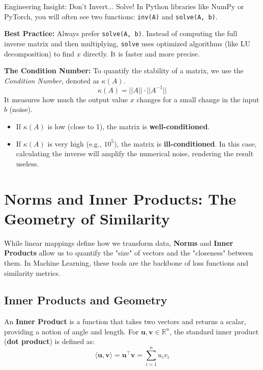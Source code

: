 \begin{unibobox}{Engineering Insight: Don't Invert... Solve!}
In Python libraries like NumPy or PyTorch, you will often see two functions: \texttt{inv(A)} and \texttt{solve(A, b)}.

\textbf{Best Practice:} Always prefer \texttt{solve(A, b)}.
Instead of computing the full inverse matrix and then multiplying, \texttt{solve} uses optimized algorithms (like LU decomposition) to find $x$ directly. It is faster and more precise.

\textbf{The Condition Number:}
To quantify the stability of a matrix, we use the \textit{Condition Number}, denoted as $\kappa(A)$.
\[
\kappa(A) = ||A|| \cdot ||A^{-1}||
\]
It measures how much the output value $x$ changes for a small change in the input $b$ (noise).
\begin{itemize}
    \item If $\kappa(A)$ is low (close to 1), the matrix is \textbf{well-conditioned}.
    \item If $\kappa(A)$ is very high (e.g., $10^5$), the matrix is \textbf{ill-conditioned}. In this case, calculating the inverse will amplify the numerical noise, rendering the result useless.
\end{itemize}
\end{unibobox}

\section{Norms and Inner Products: The Geometry of Similarity}

While linear mappings define how we transform data, \textbf{Norms} and \textbf{Inner Products} allow us to quantify the "size" of vectors and the "closeness" between them. In Machine Learning, these tools are the backbone of loss functions and similarity metrics.

\subsection{Inner Products and Geometry}
An \textbf{Inner Product} is a function that takes two vectors and returns a scalar, providing a notion of angle and length. For $\mathbf{u}, \mathbf{v} \in \mathbb{R}^n$, the standard inner product (\textbf{dot product}) is defined as:
\begin{equation}
    \langle \mathbf{u}, \mathbf{v} \rangle = \mathbf{u}^\top \mathbf{v} = \sum_{i=1}^n u_i v_i
\end{equation}



